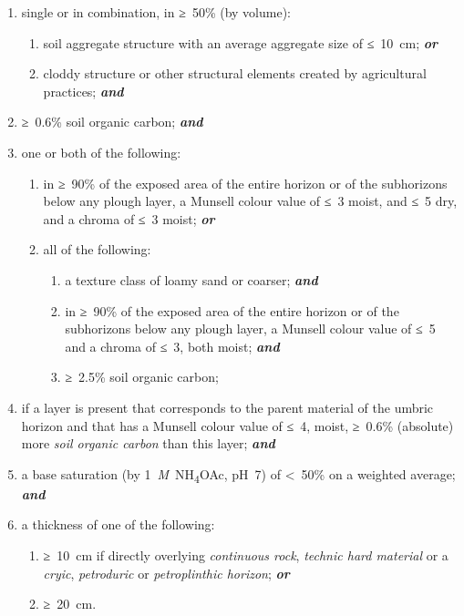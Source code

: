 \documentclass[
  letterpaper,
  DIV=11,
  numbers=noendperiod]{scrreprt}
\providecommand{\tightlist}{%
  \setlength{\itemsep}{0pt}\setlength{\parskip}{0pt}}\usepackage{longtable,booktabs,array}
\begin{document}
\begin{enumerate}
\def\labelenumi{\arabic{enumi}.}
\item
  single or in combination, in ≥~50\% (by volume):

  \begin{enumerate}
  \def\labelenumii{\alph{enumii}.}
  \tightlist
  \item
    soil aggregate structure with an average aggregate size of ≤~10~cm;
    \textbf{\emph{or}}
  \item
    cloddy structure or other structural elements created by
    agricultural practices; \textbf{\emph{and}}
  \end{enumerate}
\item
  ≥~0.6\% soil organic carbon; \textbf{\emph{and}}
\item
  one or both of the following:

  \begin{enumerate}
  \def\labelenumii{\alph{enumii}.}
  \tightlist
  \item
    in ≥~90\% of the exposed area of the entire horizon or of the
    subhorizons below any plough layer, a Munsell colour value of ≤~3
    moist, and ≤~5 dry, and a chroma of ≤~3 moist; \textbf{\emph{or}}
  \item
    all of the following:

    \begin{enumerate}
    \def\labelenumiii{\roman{enumiii}.}
    \tightlist
    \item
      a texture class of loamy sand or coarser; \textbf{\emph{and}}
    \item
      in ≥~90\% of the exposed area of the entire horizon or of the
      subhorizons below any plough layer, a Munsell colour value of ≤~5
      and a chroma of ≤~3, both moist; \textbf{\emph{and}}
    \item
      ≥~2.5\% soil organic carbon;
    \end{enumerate}
  \end{enumerate}
\item
  if a layer is present that corresponds to the parent material of the
  umbric horizon and that has a Munsell colour value of ≤~4, moist,
  ≥~0.6\% (absolute) more \emph{soil organic carbon} than this layer;
  \textbf{\emph{and}}
\item
  a base saturation (by 1~\emph{M}~NH\textsubscript{4}OAc, pH~7) of
  \textless~50\% on a weighted average; \textbf{\emph{and}}
\item
  a thickness of one of the following:

  \begin{enumerate}
  \def\labelenumii{\alph{enumii}.}
  \tightlist
  \item
    ≥~10~cm if directly overlying \emph{continuous rock}, \emph{technic
    hard material} or a \emph{cryic}, \emph{petroduric} or
    \emph{petroplinthic horizon}; \textbf{\emph{or}}
  \item
    ≥~20~cm.
  \end{enumerate}
\end{enumerate}
\end{document}
